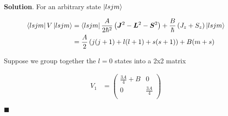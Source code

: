 \documentclass[12pt]{article}
\theoremstyle{definition}
\newenvironment{s}{%
        \begin{trivlist} \item \textbf{Solution}. }{%
            \hspace*{\fill} $\blacksquare$\end{trivlist}}%
\begin{document}
{\begin{s}
For an arbitrary state $\ket{lsjm}$

\begin{align*}
\bra{lsjm}V\ket{lsjm} &= \bra{lsjm}\frac{A}{2\hbar^{2}}\left(\bm{J}^{2}-\bm{L}^{2}-\bm{S}^{2}\right) + \frac{B}{\hbar}\left(J_z + S_z\right)\ket{lsjm}\\
&= \frac{A}{2}\left(j(j+1)+l(l+1)+s(s+1)\right) + B(m+s)
\end{align*} 

Suppose we group together the $l=0$ states into a 2x2 matrix

\begin{align*}
V_{1} &= \begin{pmatrix}
\frac{3A}{4} + B& 0\\
0 & \frac{3A}{4}\\
\end{pmatrix}
\end{align*}

\end{s}
\end{document}
